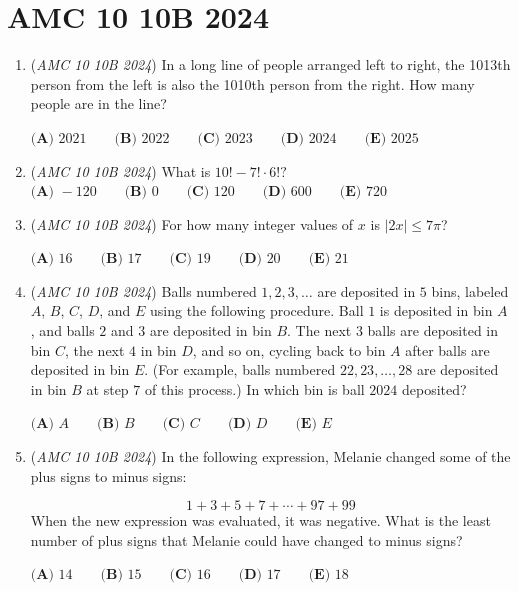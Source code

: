 \section{AMC 10 10B 2024}
        \begin{enumerate}
        	\item (\textit{AMC 10 10B 2024}) In a long line of people arranged left to right, the 1013th person from the left is also the 1010th person from the right. How many people are in the line?


 $\textbf{(A) } 2021 \qquad\textbf{(B) } 2022 \qquad\textbf{(C) } 2023 \qquad\textbf{(D) } 2024 \qquad\textbf{(E) } 2025$


	\item (\textit{AMC 10 10B 2024}) What is $10! - 7! \cdot 6!?$
$\textbf{(A) } -120 \qquad\textbf{(B) } 0 \qquad\textbf{(C) } 120 \qquad\textbf{(D) } 600 \qquad\textbf{(E) } 720$


	\item (\textit{AMC 10 10B 2024}) For how many integer values of $x$ is $|2x| \leq 7 \pi$?


 $\textbf{(A) } 16 \qquad\textbf{(B) } 17 \qquad\textbf{(C) } 19 \qquad\textbf{(D) } 20 \qquad\textbf{(E) } 21$


	\item (\textit{AMC 10 10B 2024}) Balls numbered $1, 2, 3, \dots$ are deposited in $5$ bins, labeled $A$, $B$, $C$, $D$, and $E$ using the following procedure. Ball $1$ is deposited in bin $A$, and balls $2$ and $3$ are deposited in bin $B$. The next $3$ balls are deposited in bin $C$, the next $4$ in bin $D$, and so on, cycling back to bin $A$ after balls are deposited in bin $E$. (For example, balls numbered $22, 23, \dots, 28$ are deposited in bin $B$ at step $7$ of this process.) In which bin is ball $2024$ deposited?


 $\textbf{(A) } A \qquad\textbf{(B) } B \qquad\textbf{(C) } C \qquad\textbf{(D) } D \qquad\textbf{(E) } E$


	\item (\textit{AMC 10 10B 2024}) In the following expression, Melanie changed some of the plus signs to minus signs:

 \[1+3+5+7+\cdots+97+99\]
When the new expression was evaluated, it was negative. What is the least number of plus signs that Melanie could have changed to minus signs?


 $\textbf{(A) } 14 \qquad\textbf{(B) } 15 \qquad\textbf{(C) } 16 \qquad\textbf{(D) } 17 \qquad\textbf{(E) } 18$



\end{enumerate}
